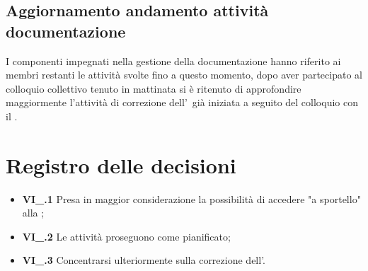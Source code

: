 \subsection{Aggiornamento andamento attività documentazione}
I componenti impegnati nella gestione della documentazione hanno riferito ai membri restanti le attività svolte fino a questo momento, dopo aver partecipato al colloquio collettivo tenuto in mattinata si è ritenuto di approfondire maggiormente l'attività di correzione dell'\AdR\ già iniziata a seguito del colloquio con il \CR{}.

\section{Registro delle decisioni}
\begin{itemize}
	\item \textbf{VI\_\Data.1} Presa in maggior considerazione la possibilità di accedere "a sportello" alla ;
	\item \textbf{VI\_\Data.2} Le attività proseguono come pianificato;
	\item \textbf{VI\_\Data.3} Concentrarsi ulteriormente sulla correzione dell'\AdR{}.
\end{itemize}